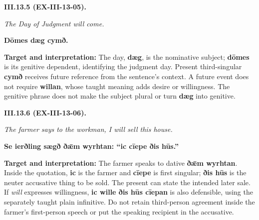 \par\begin{minipage}{\linewidth}\raggedright
\textbf{III.13.5 (EX-III-13-05).}

\emph{The Day of Judgment will come.}

\textbf{Dōmes dæg cymð.}

\textbf{Target and interpretation:} The day, \textbf{dæg}, is the nominative subject; \textbf{dōmes} is its genitive dependent, identifying the judgment day. Present third-singular \textbf{cymð} receives future reference from the sentence's context. A future event does not require \textbf{willan}, whose taught meaning adds desire or willingness. The genitive phrase does not make the subject plural or turn \textbf{dæg} into genitive.

\end{minipage}\par\addvspace{4pt}

\par\begin{minipage}{\linewidth}\raggedright
\textbf{III.13.6 (EX-III-13-06).}

\emph{The farmer says to the workman, I will sell this house.}

\textbf{Se ierðling sægð ðǣm wyrhtan: “ic cīepe ðis hūs.”}

\textbf{Target and interpretation:} The farmer speaks to dative \textbf{ðǣm wyrhtan}. Inside the quotation, \textbf{ic} is the farmer and \textbf{cīepe} is first singular; \textbf{ðis hūs} is the neuter accusative thing to be sold. The present can state the intended later sale. If \emph{will} expresses willingness, \textbf{ic wille ðis hūs cīepan} is also defensible, using the separately taught plain infinitive. Do not retain third-person agreement inside the farmer's first-person speech or put the speaking recipient in the accusative.

\end{minipage}\par\addvspace{4pt}

